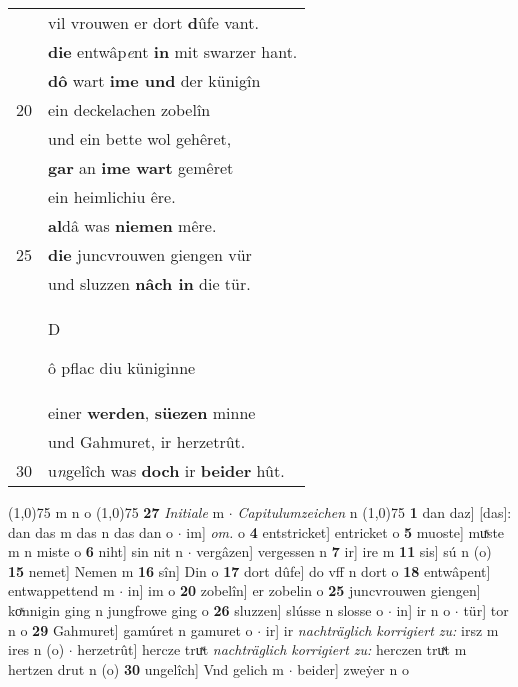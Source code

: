 \documentclass[8pt,a4paper,notitlepage]{article}
\begin{document}
\begin{table}[ht]
\begin{minipage}[t]{0.5\linewidth}
\begin{tabular}{rl}
 & vil vrouwen er dort \textbf{d}ûfe vant.\\ 
 & \textbf{die} entwâp\textit{e}nt \textbf{in} mit swarzer hant.\\ 
 & \textbf{dô} wart \textbf{ime und} der künigîn\\ 
20 & ein deckelachen zobelîn\\ 
 & und ein bette wol gehêret,\\ 
 & \textbf{gar} an \textbf{ime wart} gemêret\\ 
 & ein heimlichiu êre.\\ 
 & \textbf{al}dâ was \textbf{niemen} mêre.\\ 
25 & \textbf{die} juncvrouwen giengen vür\\ 
 & und sluzzen \textbf{nâch in} die tür.\\ 
 & \begin{large}D\end{large}ô pflac diu küniginne\\ 
 & einer \textbf{werden}, \textbf{süezen} minne\\ 
 & und Gahmuret, ir herzetrût.\\ 
30 & u\textit{n}gelîch was \textbf{doch} ir \textbf{beider} hût.\\ 
\end{tabular}
\scriptsize
\line(1,0){75} \newline
m n o \newline
\line(1,0){75} \newline
\textbf{27} \textit{Initiale} m   $\cdot$ \textit{Capitulumzeichen} n  \newline
\line(1,0){75} \newline
\textbf{1} dan daz] [das]: dan das m das n das dan o  $\cdot$ im] \textit{om.} o \textbf{4} entstricket] entricket o \textbf{5} muoste] muͯste m n miste o \textbf{6} niht] sin nit n  $\cdot$ vergâzen] vergessen n \textbf{7} ir] ire m \textbf{11} sis] sú n (o) \textbf{15} nemet] Nemen m \textbf{16} sîn] Din o \textbf{17} dort dûfe] do vff n dort o \textbf{18} entwâpent] entwappettend m  $\cdot$ in] im o \textbf{20} zobelîn] er zobelin o \textbf{25} juncvrouwen giengen] koͯnnigin ging n jungfrowe ging o \textbf{26} sluzzen] slússe n slosse o  $\cdot$ in] ir n o  $\cdot$ tür] tor n o \textbf{29} Gahmuret] gamúret n gamuret o  $\cdot$ ir] ir \textit{nachträglich korrigiert zu:} irsz m ires n (o)  $\cdot$ herzetrût] hercze truͯt \textit{nachträglich korrigiert zu:} herczen truͯt m hertzen drut n (o) \textbf{30} ungelîch] Vnd gelich m  $\cdot$ beider] zweẏer n o \newline
\end{minipage}
\end{table}
\end{document}
